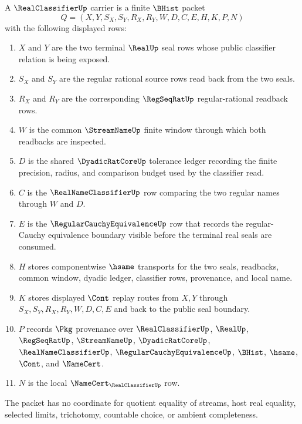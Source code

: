 \begin{definition}
\label{def:real-classifier-carrier}
A $\RealClassifierUp$ carrier is a finite $\BHist$ packet
$$
Q=(X,Y,S_X,S_Y,R_X,R_Y,W,D,C,E,H,K,P,N)
$$
with the following displayed rows:
\begin{enumerate}
\item $X$ and $Y$ are the two terminal $\RealUp$ seal rows whose public classifier relation is being exposed.
\item $S_X$ and $S_Y$ are the regular rational source rows read back from the two seals.
\item $R_X$ and $R_Y$ are the corresponding $\RegSeqRatUp$ regular-rational readback rows.
\item $W$ is the common $\StreamNameUp$ finite window through which both readbacks are inspected.
\item $D$ is the shared $\DyadicRatCoreUp$ tolerance ledger recording the finite precision, radius, and comparison budget used by the classifier read.
\item $C$ is the $\RealNameClassifierUp$ row comparing the two regular names through $W$ and $D$.
\item $E$ is the $\RegularCauchyEquivalenceUp$ row that records the regular-Cauchy equivalence boundary visible before the terminal real seals are consumed.
\item $H$ stores componentwise $\hsame$ transports for the two seals, readbacks, common window, dyadic ledger, classifier rows, provenance, and local name.
\item $K$ stores displayed $\Cont$ replay routes from $X,Y$ through $S_X,S_Y,R_X,R_Y,W,D,C,E$ and back to the public seal boundary.
\item $P$ records $\Pkg$ provenance over $\RealClassifierUp$, $\RealUp$, $\RegSeqRatUp$, $\StreamNameUp$, $\DyadicRatCoreUp$, $\RealNameClassifierUp$, $\RegularCauchyEquivalenceUp$, $\BHist$, $\hsame$, $\Cont$, and $\NameCert$.
\item $N$ is the local $\NameCert_{\RealClassifierUp}$ row.
\end{enumerate}
The packet has no coordinate for quotient equality of streams, host real equality, selected limits, trichotomy, countable choice, or ambient completeness.
\end{definition}

